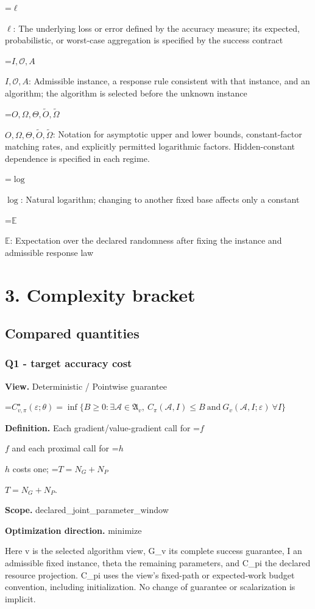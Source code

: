 \documentclass[10pt,a4paper]{article}
\newcommand{\AtlasMath}[1]{\par\begingroup\centering\setbox0=\hbox{$\displaystyle #1$}\ifdim\wd0>1.4\linewidth\typeout{ATLAS WIDE FORMULA: \the\wd0}\fi\ifdim\wd0>\linewidth\resizebox{\linewidth}{!}{\box0}\else\box0\fi\par\endgroup}
\newcommand{\AtlasInlineMath}[1]{\begingroup\setbox0=\hbox{$#1$}\ifdim\wd0>.4\linewidth\endgroup\AtlasMath{#1}\else\endgroup$#1$\fi}
\begin{document}
\AtlasInlineMath{\ell}: The underlying loss or error defined by the accuracy measure; its expected, probabilistic, or worst-case aggregation is specified by the success contract

\AtlasInlineMath{I,\mathcal{O},A}: Admissible instance, a response rule consistent with that instance, and an algorithm; the algorithm is selected before the unknown instance

\AtlasInlineMath{O,\Omega,\Theta,\widetilde{O},\widetilde\Omega}: Notation for asymptotic upper and lower bounds, constant-factor matching rates, and explicitly permitted logarithmic factors. Hidden-constant dependence is specified in each regime.

\AtlasInlineMath{\log}: Natural logarithm; changing to another fixed base affects only a constant

\AtlasInlineMath{\mathbb{E}}: Expectation over the declared randomness after fixing the instance and admissible response law

\section{3. Complexity bracket}
\subsection{Compared quantities}
\subsubsection{Q1 - target accuracy cost}
\textbf{View.} Deterministic / Pointwise guarantee

\AtlasMath{C^\star_{v,\pi}(\varepsilon;\theta)=\inf\{B\ge0:\exists\mathcal A\in\mathfrak A_v,\ C_\pi(\mathcal A,I)\le B\ \text{and}\ G_v(\mathcal A,I;\varepsilon)\ \forall I\}}
\textbf{Definition.} Each gradient/value-gradient call for \AtlasInlineMath{f} and each proximal call for \AtlasInlineMath{h} costs one; \AtlasInlineMath{T=N_G+N_P}.

\textbf{Scope.} declared\_joint\_parameter\_window

\textbf{Optimization direction.} minimize

Here v is the selected algorithm view, G\_v its complete success guarantee, I an admissible fixed instance, theta the remaining parameters, and C\_pi the declared resource projection. C\_pi uses the view's fixed-path or expected-work budget convention, including initialization. No change of guarantee or scalarization is implicit.
\end{document}
